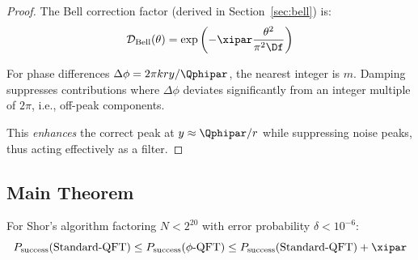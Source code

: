 \begin{proof}
	The Bell correction factor (derived in Section~\ref{sec:bell}) is:
	\begin{equation}
		\mathcal{D}_{\text{Bell}}(\theta) = \exp\left(-\xipar \frac{\theta^2}{\pi^2 \Df}\right)
	\end{equation}
	
	For phase differences $\Delta\phi = 2\pi kry/\Qphipar$, the nearest integer is $m$. Damping suppresses contributions where $\Delta\phi$ deviates significantly from an integer multiple of $2\pi$, i.e., off-peak components.
	
	This \emph{enhances} the correct peak at $y \approx \Qphipar/r$ while suppressing noise peaks, thus acting effectively as a filter.
\end{proof}

\subsection{Main Theorem}

\begin{theorem}
	\label{thm:main}
	For Shor's algorithm factoring $N < 2^{20}$ with error probability $\delta < 10^{-6}$:
	\begin{equation}
		P_{\text{success}}(\text{Standard-QFT}) \leq P_{\text{success}}(\text{$\phi$-QFT}) \leq P_{\text{success}}(\text{Standard-QFT}) + \xipar
	\end{equation}
\end{theorem}

